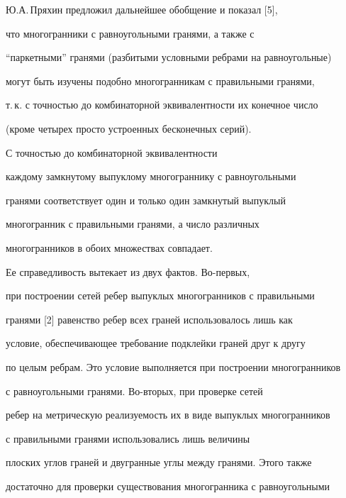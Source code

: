  


Ю.А.\,Пряхин предложил дальнейшее обобщение и показал [5],  


что многогранники с равноугольными гранями, а также с 


``паркетными'' гранями (разбитыми условными ребрами на равноугольные) 


могут быть изучены подобно многогранникам с правильными гранями, 


т.\,к. с точностью до комбинаторной эквивалентности их конечное число 


(кроме четырех просто устроенных бесконечных серий). 


 


 


\begin{thm}


С точностью до комбинаторной эквивалентности  


каждому замкнутому выпуклому многограннику с равноугольными 


гранями соответствует один и только один замкнутый выпуклый 


многогранник с правильными гранями, а число различных  


многогранников в обоих множествах совпадает. 


\end{thm} 


 


Ее справедливость вытекает из двух фактов. Во-первых,  


при построении сетей ребер выпуклых многогранников с правильными 


гранями [2] равенство ребер всех граней использовалось лишь как 


условие, обеспечивающее требование подклейки граней друг к другу  


по целым ребрам. Это условие выполняется при построении многогранников 


с равноугольными гранями. Во-вторых, при проверке сетей 


ребер на метрическую реализуемость их в виде выпуклых многогранников 


с правильными гранями использовались лишь величины 


плоских углов граней и двугранные углы между гранями. Этого также 


достаточно для проверки существования многогранника с равноугольными 


